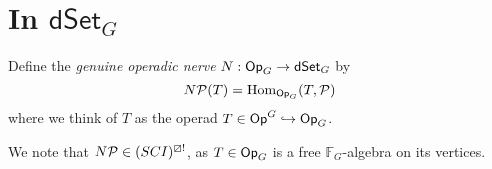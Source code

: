 \documentclass[a4paper,10pt
,draft
]{article}%
\renewcommand{\1}{\eta}%
\begin{document}

\newpage

\section{In $\mathsf{dSet}_G$}

\begin{definition}
      Define the \textit{genuine operadic nerve} $N: \Op_G \to \dSet_G$ by
      \begin{equation}
            N\P(T) = \Hom_{\Op_G}(T, \P)
      \end{equation}
      where we think of $T$ as the operad $T \in \Op^G \into \Op_G$. 
\end{definition}

\begin{remark}
      We note that $N\P \in (SCI)^{\boxslash !}$,
      as $T \in \Op_G$ is a free $\mathbb F_G$-algebra on its vertices.
\end{remark}
\end{document}
